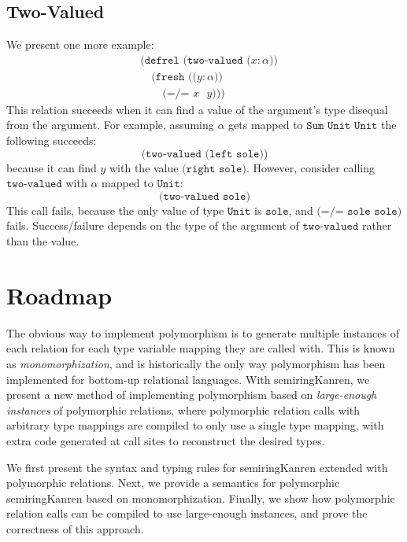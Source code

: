 \documentclass{report}
\theoremstyle{definition}
\begin{document}
\subsection{Two-Valued}

We present one more example:
\begin{equation}
\begin{aligned}
	& \texttt{(defrel (two-valued (\(x : \alpha\)))} \\
	& \quad \texttt{(fresh ((\(y : \alpha\)))} \\
	& \quad \quad \texttt{(=/= \(x\) \(y\))))}
\end{aligned}
\end{equation}
This relation succeeds when it can find a value of the argument's type disequal from the argument.
For example, assuming \(\alpha\) gets mapped to \(\texttt{Sum Unit Unit}\) the following succeeds:
\begin{equation}
	\texttt{(two-valued (left sole))}
\end{equation}
because it can find \(y\) with the value \(\texttt{(right sole)}\).
However, consider calling \(\texttt{two-valued}\) with \(\alpha\) mapped to \(\texttt{Unit}\):
\begin{equation}
	\texttt{(two-valued sole)}
\end{equation}
This call fails, because the only value of type \(\texttt{Unit}\) is \(\texttt{sole}\), and \(\texttt{(=/= sole sole)}\) fails.
Success/failure depends on the type of the argument of \(\texttt{two-valued}\) rather than the value.

\section{Roadmap}

The obvious way to implement polymorphism is to generate multiple instances of each relation for each type variable mapping they are called with.
This is known as \emph{monomorphization}, and is historically the only way polymorphism has been implemented for bottom-up relational languages.
With semiringKanren, we present a new method of implementing polymorphism based on \emph{large-enough instances} of polymorphic relations,
where polymorphic relation calls with arbitrary type mappings are compiled to only use a single type mapping, with extra code generated at call sites to reconstruct the desired types.

We first present the syntax and typing rules for semiringKanren extended with polymorphic relations.
Next, we provide a semantics for polymorphic semiringKanren based on monomorphization.
Finally, we show how polymorphic relation calls can be compiled to use large-enough instances, and prove the correctness of this approach.
\end{document}
